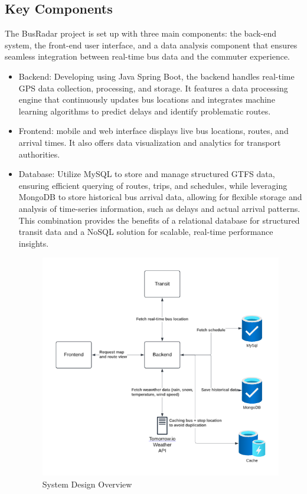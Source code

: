 \documentclass[conference]{IEEEtran}
\begin{document}
\subsection{Key Components}
The BusRadar project is set up with three main components: the back-end system, the front-end user interface, and a data analysis component that ensures seamless integration between real-time bus data and the commuter experience.  
\begin{itemize}
    \item Backend: Developing using Java Spring Boot, the backend handles real-time GPS data collection, processing, and storage. It features a data processing engine that continuously updates bus locations and integrates machine learning algorithms to predict delays and identify problematic routes.
    \item Frontend: mobile and web interface displays live bus locations, routes, and arrival times. It also offers data visualization and analytics for transport authorities.
    \item Database: Utilize MySQL to store and manage structured GTFS data, ensuring efficient querying of routes, trips, and schedules, while leveraging MongoDB to store historical bus arrival data, allowing for flexible storage and analysis of time-series information, such as delays and actual arrival patterns. This combination provides the benefits of a relational database for structured transit data and a NoSQL solution for scalable, real-time performance insights.
\begin{figure}
    \centering
    \includegraphics[width=1\linewidth]{System Design.png}
    \caption{System Design Overview}
    \label{fig:enter-label}
\end{figure}
    

\end{itemize}
\end{document}
